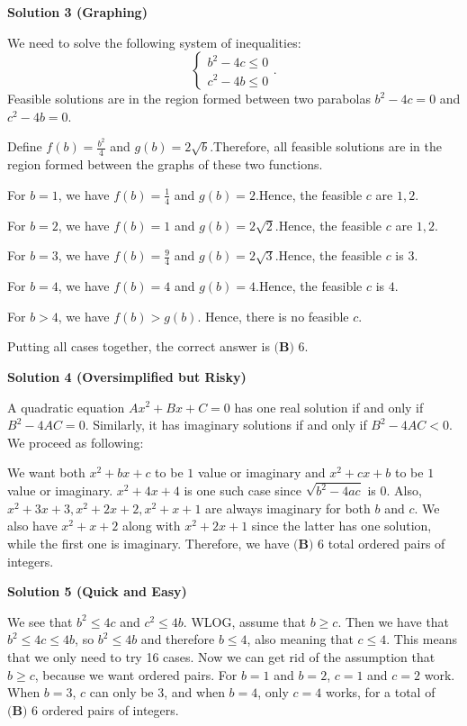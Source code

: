 \begin{enumerate}
 



\textbf{Solution 3 (Graphing)}

We need to solve the following system of inequalities:
 \[ \left\{ \begin{array}{ll} b^2 - 4 c \leq 0 \\ c^2 - 4 b \leq 0 \end{array} \right.. \]Feasible solutions are in the region formed between two parabolas $b^2 - 4 c = 0$ and $c^2 - 4 b = 0$.

 Define $f \left( b \right) = \frac{b^2}{4}$ and $g \left( b \right) = 2 \sqrt{b}$.Therefore, all feasible solutions are in the region formed between the graphs of these two functions.

 For $b = 1$, we have $f(b) = \frac{1}{4}$ and $g(b) = 2$.Hence, the feasible $c$ are $1, 2$.

 For $b = 2$, we have $f(b) = 1$ and $g(b) = 2 \sqrt{2}$.Hence, the feasible $c$ are $1, 2$.

 For $b = 3$, we have $f(b) = \frac{9}{4}$ and $g(b) = 2 \sqrt{3}$.Hence, the feasible $c$ is $3$.

 For $b = 4$, we have $f(b) = 4$ and $g(b) = 4$.Hence, the feasible $c$ is $4$.

 For $b > 4$, we have $f(b) > g(b)$. Hence, there is no feasible $c$.

 Putting all cases together, the correct answer is $\boxed{\textbf{(B) } 6}$.

 



\textbf{Solution 4 (Oversimplified but Risky)}

A quadratic equation $Ax^2+Bx+C=0$ has one real solution if and only if $B^2-4AC=0.$ Similarly, it has imaginary solutions if and only if $B^2-4AC<0.$ We proceed as following:

 We want both $x^2+bx+c$ to be $1$ value or imaginary and $x^2+cx+b$ to be $1$ value or imaginary. $x^2+4x+4$ is one such case since $\sqrt {b^2-4ac}$ is $0.$ Also, $x^2+3x+3, x^2+2x+2, x^2+x+1$ are always imaginary for both $b$ and $c.$ We also have $x^2+x+2$ along with $x^2+2x+1$ since the latter has one solution, while the first one is imaginary. Therefore, we have $\boxed{\textbf{(B) } 6}$ total ordered pairs of integers.

 



\textbf{Solution 5 (Quick and Easy)}

We see that $b^2 \leq 4c$ and $c^2 \leq 4b.$ WLOG, assume that $b \geq c.$ Then we have that $b^2 \leq 4c \leq 4b$, so $b^2 \leq 4b$ and therefore $b \leq 4$, also meaning that $c \leq 4.$ This means that we only need to try 16 cases. Now we can get rid of the assumption that $b \geq c$, because we want ordered pairs. For $b = 1$ and $b = 2$, $c = 1$ and $c = 2$ work. When $b = 3$, $c$ can only be $3$, and when $b = 4$, only $c = 4$ works, for a total of $\boxed{\textbf{(B) } 6}$ ordered pairs of integers.


\end{enumerate}
